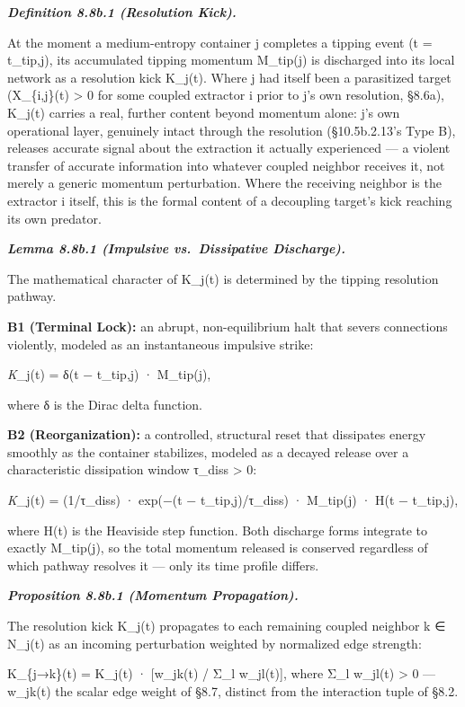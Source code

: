 \documentclass[
]{article}
\begin{document}
\emph{\textbf{Definition 8.8b.1 (Resolution Kick).}}

At the moment a medium-entropy container j completes a tipping event (t
= t\_tip,j), its accumulated tipping momentum M\_tip(j) is discharged
into its local network as a resolution kick K\_j(t). Where j had itself
been a parasitized target (X\_\{i,j\}(t) \textgreater{} 0 for some
coupled extractor i prior to j's own resolution, §8.6a), K\_j(t) carries
a real, further content beyond momentum alone: j's own operational
layer, genuinely intact through the resolution (§10.5b.2.13's Type B),
releases accurate signal about the extraction it actually experienced
--- a violent transfer of accurate information into whatever coupled
neighbor receives it, not merely a generic momentum perturbation. Where
the receiving neighbor is the extractor i itself, this is the formal
content of a decoupling target's kick reaching its own predator.

\emph{\textbf{Lemma 8.8b.1 (Impulsive vs.~Dissipative Discharge).}}

The mathematical character of K\_j(t) is determined by the tipping
resolution pathway.

\textbf{B1 (Terminal Lock):} an abrupt, non-equilibrium halt that severs
connections violently, modeled as an instantaneous impulsive strike:

\emph{K}\_j(t) = δ(t − t\_tip,j) · M\_tip(j),

where δ is the Dirac delta function.

\textbf{B2 (Reorganization):} a controlled, structural reset that
dissipates energy smoothly as the container stabilizes, modeled as a
decayed release over a characteristic dissipation window τ\_diss
\textgreater{} 0:

\emph{K}\_j(t) = (1/τ\_diss) · exp(−(t − t\_tip,j)/τ\_diss) · M\_tip(j)
· H(t − t\_tip,j),

where H(t) is the Heaviside step function. Both discharge forms
integrate to exactly M\_tip(j), so the total momentum released is
conserved regardless of which pathway resolves it --- only its time
profile differs.

\emph{\textbf{Proposition 8.8b.1 (Momentum Propagation).}}

The resolution kick K\_j(t) propagates to each remaining coupled
neighbor k ∈ N\_j(t) as an incoming perturbation weighted by normalized
edge strength:

K\_\{j→k\}(t) = K\_j(t) · {[}w\_jk(t) / Σ\_l w\_jl(t){]}, where Σ\_l
w\_jl(t) \textgreater{} 0 --- w\_jk(t) the scalar edge weight of §8.7,
distinct from the interaction tuple of §8.2.
\end{document}
